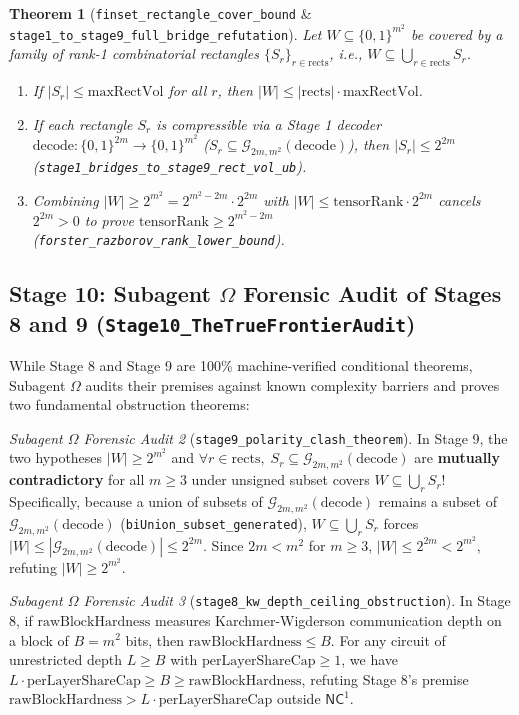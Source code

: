\documentclass[11pt,a4paper]{article}
\theoremstyle{plain}
\newtheorem{theorem}{Theorem}[section]
\theoremstyle{definition}
\theoremstyle{remark}
\newtheorem{audit}[theorem]{Subagent $\Omega$ Forensic Audit}
\newcommand{\lean}[1]{\texttt{\textcolor{slate}{#1}}}
\newcommand{\NC}{\mathsf{NC}}
\begin{document}
\begin{theorem}[\lean{finset\_rectangle\_cover\_bound} \& \lean{stage1\_to\_stage9\_full\_bridge\_refutation}]
Let $W \subseteq \{0,1\}^{m^2}$ be covered by a family of rank-1 combinatorial rectangles $\{S_r\}_{r \in \mathrm{rects}}$, i.e., $W \subseteq \bigcup_{r \in \mathrm{rects}} S_r$.
\begin{enumerate}[noitemsep]
    \item If $|S_r| \le \mathrm{maxRectVol}$ for all $r$, then $|W| \le |\mathrm{rects}| \cdot \mathrm{maxRectVol}$.
    \item If each rectangle $S_r$ is compressible via a Stage 1 decoder $\mathrm{decode} : \{0,1\}^{2m} \to \{0,1\}^{m^2}$ ($S_r \subseteq \mathcal{G}_{2m, m^2}(\mathrm{decode})$), then $|S_r| \le 2^{2m}$ (\lean{stage1\_bridges\_to\_stage9\_rect\_vol\_ub}).
    \item Combining $|W| \ge 2^{m^2} = 2^{m^2 - 2m} \cdot 2^{2m}$ with $|W| \le \mathrm{tensorRank} \cdot 2^{2m}$ cancels $2^{2m} > 0$ to prove $\mathrm{tensorRank} \ge 2^{m^2 - 2m}$ (\lean{forster\_razborov\_rank\_lower\_bound}).
\end{enumerate}
\end{theorem}

\subsection{Stage 10: Subagent $\Omega$ Forensic Audit of Stages 8 and 9 (\lean{Stage10\_TheTrueFrontierAudit})}
While Stage 8 and Stage 9 are 100\% machine-verified conditional theorems, Subagent $\Omega$ audits their premises against known complexity barriers and proves two fundamental obstruction theorems:

\begin{audit}[\lean{stage9\_polarity\_clash\_theorem}]
In Stage 9, the two hypotheses $|W| \ge 2^{m^2}$ and $\forall r \in \mathrm{rects},\; S_r \subseteq \mathcal{G}_{2m, m^2}(\mathrm{decode})$ are \textbf{mutually contradictory} for all $m \ge 3$ under unsigned subset covers $W \subseteq \bigcup_r S_r$! Specifically, because a union of subsets of $\mathcal{G}_{2m, m^2}(\mathrm{decode})$ remains a subset of $\mathcal{G}_{2m, m^2}(\mathrm{decode})$ (\lean{biUnion\_subset\_generated}), $W \subseteq \bigcup_r S_r$ forces $|W| \le |\mathcal{G}_{2m, m^2}(\mathrm{decode})| \le 2^{2m}$. Since $2m < m^2$ for $m \ge 3$, $|W| \le 2^{2m} < 2^{m^2}$, refuting $|W| \ge 2^{m^2}$.
\end{audit}

\begin{audit}[\lean{stage8\_kw\_depth\_ceiling\_obstruction}]
In Stage 8, if $\mathrm{rawBlockHardness}$ measures Karchmer-Wigderson communication depth on a block of $B = m^2$ bits, then $\mathrm{rawBlockHardness} \le B$. For any circuit of unrestricted depth $L \ge B$ with $\mathrm{perLayerShareCap} \ge 1$, we have $L \cdot \mathrm{perLayerShareCap} \ge B \ge \mathrm{rawBlockHardness}$, refuting Stage 8's premise $\mathrm{rawBlockHardness} > L \cdot \mathrm{perLayerShareCap}$ outside $\NC^1$.
\end{audit}
\end{document}

